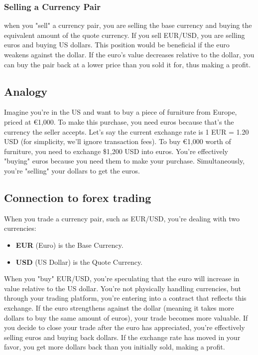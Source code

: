 \documentclass{report}
\begin{document}
     \subsubsection{Selling a Currency Pair}
     \bigbreak \noindent 
      when you "sell" a currency pair, you are selling the base currency and buying the equivalent amount of the quote currency.
      \bigbreak \noindent 
       If you sell EUR/USD, you are selling euros and buying US dollars. This position would be beneficial if the euro weakens against the dollar. If the euro's value decreases relative to the dollar, you can buy the pair back at a lower price than you sold it for, thus making a profit.

       \bigbreak \noindent 
       \subsection{Analogy}
       \bigbreak \noindent 
       Imagine you're in the US and want to buy a piece of furniture from Europe, priced at €1,000. To make this purchase, you need euros because that's the currency the seller accepts. Let's say the current exchange rate is 1 EUR = 1.20 USD (for simplicity, we'll ignore transaction fees). To buy €1,000 worth of furniture, you need to exchange \$1,200 USD into euros.
       \bigbreak \noindent 
       You're effectively "buying" euros because you need them to make your purchase. Simultaneously, you're "selling" your dollars to get the euros.
       \bigbreak \noindent 
       \subsection{Connection to forex trading}
       \bigbreak \noindent 
       When you trade a currency pair, such as EUR/USD, you're dealing with two currencies:
       \begin{itemize}
           \item \textbf{EUR} (Euro) is the Base Currency.
           \item \textbf{USD} (US Dollar) is the Quote Currency.
       \end{itemize}
       \bigbreak \noindent 
        When you "buy" EUR/USD, you're speculating that the euro will increase in value relative to the US dollar.
        \bigbreak \noindent 
     You're not physically handling currencies, but through your trading platform, you're entering into a contract that reflects this exchange. If the euro strengthens against the dollar (meaning it takes more dollars to buy the same amount of euros), your trade becomes more valuable.
     \bigbreak \noindent 
     If you decide to close your trade after the euro has appreciated, you're effectively selling euros and buying back dollars. If the exchange rate has moved in your favor, you get more dollars back than you initially sold, making a profit.
\end{document}
